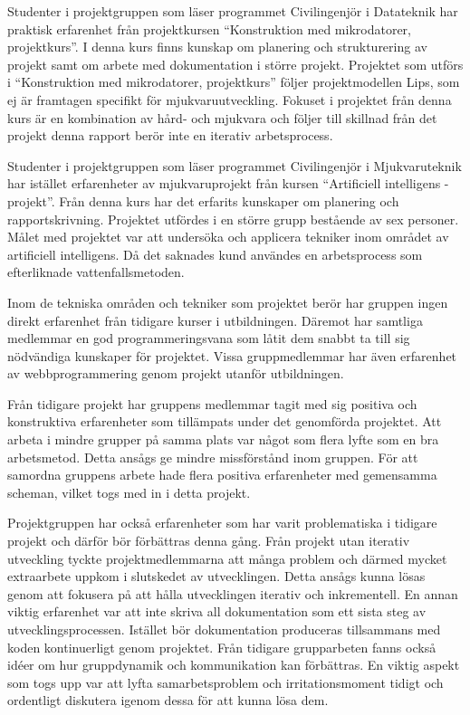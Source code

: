 Studenter i projektgruppen som läser programmet Civilingenjör i Datateknik har praktisk erfarenhet från projektkursen ``Konstruktion med mikrodatorer, projektkurs''.\cite{tsea29} I denna kurs finns kunskap om planering och strukturering av projekt samt om arbete med dokumentation i större projekt. Projektet som utförs i ``Konstruktion med mikrodatorer, projektkurs'' följer projektmodellen Lips\cite{lips}, som ej är framtagen specifikt för mjukvaruutveckling. Fokuset i projektet från denna kurs är en kombination av hård- och mjukvara och följer till skillnad från det projekt denna rapport berör inte en iterativ arbetsprocess.

Studenter i projektgruppen som läser programmet Civilingenjör i Mjukvaruteknik har istället erfarenheter av mjukvaruprojekt från kursen ``Artificiell intelligens - projekt''.\cite{tddd92} Från denna kurs har det erfarits kunskaper om planering och rapportskrivning. Projektet utfördes i en större grupp bestående av sex personer. Målet med projektet var att undersöka och applicera tekniker inom området av artificiell intelligens. Då det saknades kund användes en arbetsprocess som efterliknade vattenfallsmetoden.

Inom de tekniska områden och tekniker som projektet berör har gruppen ingen direkt erfarenhet från tidigare kurser i utbildningen. Däremot har samtliga medlemmar en god programmeringsvana som låtit dem snabbt ta till sig nödvändiga kunskaper för projektet. Vissa gruppmedlemmar har även erfarenhet av webbprogrammering genom projekt utanför utbildningen.

Från tidigare projekt har gruppens medlemmar tagit med sig positiva och konstruktiva erfarenheter som tillämpats under det genomförda projektet. Att arbeta i mindre grupper på samma plats var något som flera lyfte som en bra arbetsmetod. Detta ansågs ge mindre missförstånd inom gruppen. För att samordna gruppens arbete hade flera positiva erfarenheter med gemensamma scheman, vilket togs med in i detta projekt.

Projektgruppen har också erfarenheter som har varit problematiska i tidigare projekt och därför bör förbättras denna gång. Från projekt utan iterativ utveckling tyckte projektmedlemmarna att många problem och därmed mycket extraarbete uppkom i slutskedet av utvecklingen. Detta ansågs kunna lösas genom att fokusera på att hålla utvecklingen iterativ och inkrementell. En annan viktig erfarenhet var att inte skriva all dokumentation som ett sista steg av utvecklingsprocessen. Istället bör dokumentation produceras tillsammans med koden kontinuerligt genom projektet. Från tidigare grupparbeten fanns också idéer om hur gruppdynamik och kommunikation kan förbättras. En viktig aspekt som togs upp var att lyfta samarbetsproblem och irritationsmoment tidigt och ordentligt diskutera igenom dessa för att kunna lösa dem.
